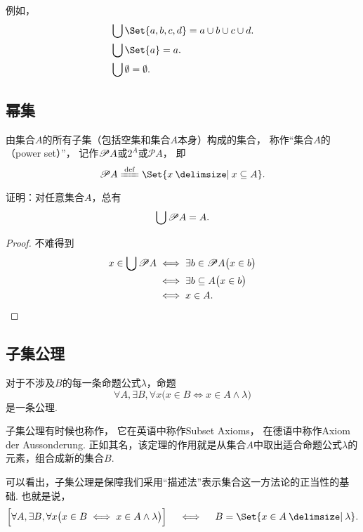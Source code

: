 例如，
\begin{align*}
	&\bigcup\Set{a,b,c,d} = a \cup b \cup c \cup d. \\
	&\bigcup\Set{a} = a. \\
	&\bigcup\emptyset = \emptyset.
\end{align*}


\subsection{幂集}
\begin{definition}
由集合\(A\)的所有子集（包括空集和集合\(A\)本身）构成的集合，
称作“集合\(A\)的（power set）”，
记作\(\mathscr{P} A\)或\(2^A\)或\(\mathcal{P}A\)，
即\[
	\Powerset A
	\defeq
	\Set{ x \given x \subseteq A }.
\]
\end{definition}

\begin{example}
证明：对任意集合\(A\)，总有
\begin{equation}\label{equation:集合论.集的幂集的并等于集}
	\bigcup \mathscr{P} A = A.
\end{equation}
\begin{proof}
不难得到
\begin{align*}
	x \in \bigcup \mathscr{P} A
	&\iff
	\exists b \in \mathscr{P} A \bigl( x \in b \bigr) \\
	&\iff
	\exists b \subseteq A \bigl( x \in b \bigr) \\
	&\iff
	x \in A.
	\qedhere
\end{align*}
\end{proof}
\end{example}

\subsection{子集公理}
\begin{axiom}[子集公理]
对于不涉及\(B\)的每一条命题公式\(\lambda\)，命题\[
	\forall A, \exists B, \forall x \bigl(
		x \in B \iff x \in A \land \lambda
	\bigr)
\]是一条公理.
\end{axiom}
子集公理有时候也称作，%
它在英语中称作Subset Axioms，%
在德语中称作Axiom der Aussonderung.
正如其名，该定理的作用就是从集合\(A\)中取出适合命题公式\(\lambda\)的元素，组合成新的集合\(B\).

可以看出，子集公理是保障我们采用“描述法”表示集合这一方法论的正当性的基础.
也就是说，\[
\Bigl[
	\forall A, \exists B, \forall x \bigl(
		x \in B \iff x \in A \land \lambda
	\bigr)
\Bigr]
\quad\iff\quad
B = \Set{ x \in A \given \lambda }.
\]

